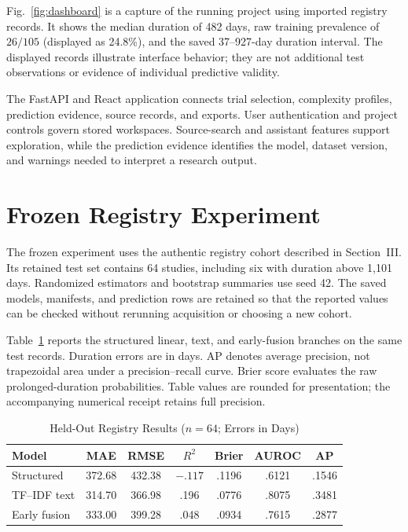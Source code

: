 \documentclass[10pt,letterpaper,twocolumn]{article}
\begin{document}
Fig.~\ref{fig:dashboard} is a capture of the running project using imported registry records. It shows the median duration of 482 days, raw training prevalence of $26/105$ (displayed as 24.8\%), and the saved 37--927-day duration interval. The displayed records illustrate interface behavior; they are not additional test observations or evidence of individual predictive validity.

The FastAPI and React application connects trial selection, complexity profiles, prediction evidence, source records, and exports. User authentication and project controls govern stored workspaces. Source-search and assistant features support exploration, while the prediction evidence identifies the model, dataset version, and warnings needed to interpret a research output.

\section{Frozen Registry Experiment}

The frozen experiment uses the authentic registry cohort described in Section~III. Its retained test set contains 64 studies, including six with duration above 1,101 days. Randomized estimators and bootstrap summaries use seed 42. The saved models, manifests, and prediction rows are retained so that the reported values can be checked without rerunning acquisition or choosing a new cohort.

Table~\ref{tab:pilotresults} reports the structured linear, text, and early-fusion branches on the same test records. Duration errors are in days. AP denotes average precision, not trapezoidal area under a precision--recall curve. Brier score evaluates the raw prolonged-duration probabilities. Table values are rounded for presentation; the accompanying numerical receipt retains full precision.

\begin{table}[!ht]
\caption{Held-Out Registry Results ($n=64$; Errors in Days)}
\label{tab:pilotresults}
\centering
\scriptsize
\setlength{\tabcolsep}{2pt}
\renewcommand{\arraystretch}{1.2}
\begin{tabular}{|p{}|c|c|c|c|c|c|}
\hline
\textbf{Model} & \textbf{MAE} & \textbf{RMSE} & \textbf{$R^2$} & \textbf{Brier} & \textbf{AUROC} & \textbf{AP} \\
\hline
Structured & 372.68 & 432.38 & $-.117$ & .1196 & .6121 & .1546 \\
\hline
TF--IDF text & 314.70 & 366.98 & .196 & .0776 & .8075 & .3481 \\
\hline
Early fusion & 333.00 & 399.28 & .048 & .0934 & .7615 & .2877 \\
\hline
\end{tabular}
\end{table}
\end{document}
